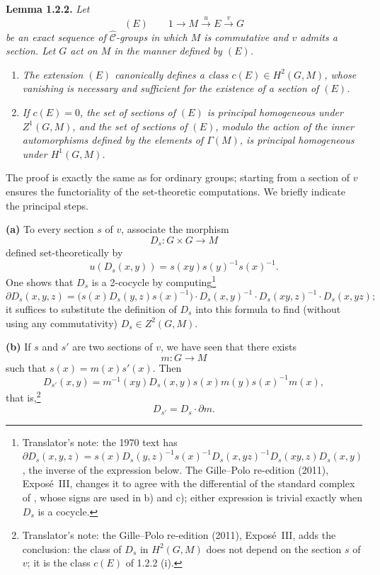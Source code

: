 \medskip
\noindent{}\textbf{Lemma 1.2.2.}
\textit{Let}
\[
 (E)\qquad
 1\longrightarrow M\xrightarrow{u}E\xrightarrow{v}G
\]
\textit{be an exact sequence of \(\widehat{\mathscr C}\)-groups in
which \(M\) is commutative and \(v\) admits a section. Let \(G\) act
on \(M\) in the manner defined by \((E)\).}
\begin{enumerate}
 \item[\SGAInlineRefTarget{sga3:iii:lemma:1-2-2:item:i}(i)] \textit{The extension \((E)\) canonically defines a class
 \(c(E)\in H^2(G,M)\), whose vanishing is necessary and sufficient for
 the existence of a section of \((E)\).}

 \item[\SGAInlineRefTarget{sga3:iii:lemma:1-2-2:item:ii}(ii)] \textit{If \(c(E)=0\), the set of sections of \((E)\) is
 principal homogeneous under \(Z^1(G,M)\), and the set of sections of
 \((E)\), modulo the action of the inner automorphisms defined by the
 elements of \(\Gamma(M)\), is principal homogeneous under
 \(H^1(G,M)\).}
\end{enumerate}

The proof is exactly the same as for ordinary groups; starting from a
section of \(v\) ensures the functoriality of the set-theoretic
computations. We briefly indicate the principal steps.

\smallskip
\noindent\textbf{(a)}
To every section \(s\) of \(v\), associate the morphism
\[
 D_s:G\times G\longrightarrow M
\]
defined set-theoretically by
\[
 u(D_s(x,y))=s(xy)s(y)^{-1}s(x)^{-1}.
\]
One shows that \(D_s\) is a 2-cocycle by computing\footnote{Translator's
note: the 1970 text has
\(\partial D_s(x,y,z)=s(x)D_s(y,z)^{-1}s(x)^{-1}D_s(x,yz)^{-1}D_s(xy,z)D_s(x,y)\),
the inverse of the expression below. The Gille--Polo re-edition (2011),
Exposé~III, changes it to agree with the differential of the standard complex
of , whose signs are used in b) and c); either expression
is trivial exactly when \(D_s\) is a cocycle.}
\[
 \partial D_s(x,y,z)
  =\bigl(s(x)D_s(y,z)s(x)^{-1}\bigr)
     \cdot D_s(x,y)^{-1}\cdot D_s(xy,z)^{-1}\cdot D_s(x,yz);
\]
it suffices to substitute the definition of \(D_s\) into this formula to find
(without using any commutativity) \(D_s\in Z^2(G,M)\).

\smallskip
\noindent\textbf{(b)}
If \(s\) and \(s'\) are two sections of \(v\), we have seen that there
exists
\[
 m:G\longrightarrow M
\]
such that \(s(x)=m(x)s'(x)\). Then
\[
 D_{s'}(x,y)=m^{-1}(xy)D_s(x,y)s(x)m(y)s(x)^{-1}m(x),
\]
that is,\footnote{Translator's note: the Gille--Polo re-edition (2011), Exposé~III, adds the conclusion:
the class of \(D_s\) in \(H^2(G,M)\) does not depend on the section \(s\) of
\(v\); it is the class \(c(E)\) of 1.2.2 (i).}
\[
 D_{s'}=D_s\cdot\partial m.
\]

